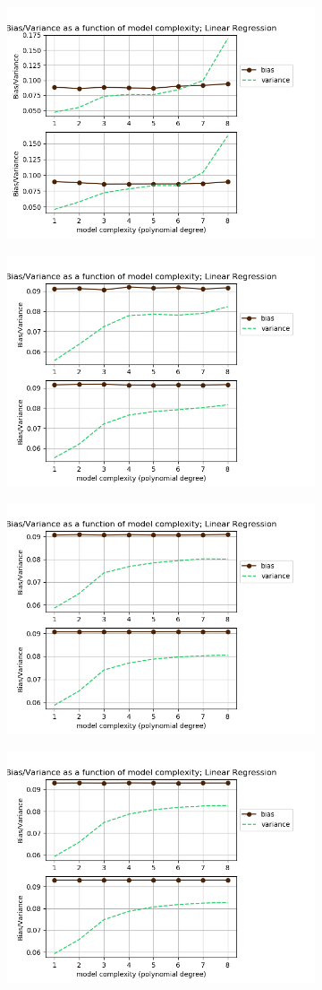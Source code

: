  \begin{figure}[!ht]
\begin{subfigure}{\textwidth}
  \centering
  \includegraphics[width=0.55\linewidth]{images/bias_var/fake_linear_bv_p08_n10.png}
\end{subfigure}
\begin{subfigure}{\textwidth}
  \centering
  \includegraphics[width=0.55\linewidth]{images/bias_var/fake_linear_bv_p08_n21.png}
\end{subfigure}
\begin{subfigure}{\textwidth}
  \centering
  \includegraphics[width=0.55\linewidth]{images/bias_var/fake_linear_bv_p08_n50.png}
\end{subfigure}
\begin{subfigure}{\textwidth}
  \centering
  \includegraphics[width=0.55\linewidth]{images/bias_var/fake_linear_bv_p08_n100.png}

\end{subfigure}
\end{figure}
